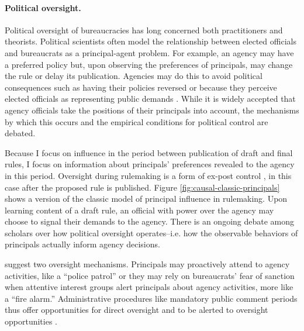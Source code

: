 \paragraph{Political oversight.}
Political oversight of bureaucracies has long concerned both practitioners and theorists.  %
Political scientists often model the relationship between elected officials and bureaucrats as a principal-agent problem. For example, an agency may have a preferred policy but, upon observing the preferences of principals, may change the rule or delay its publication. Agencies may do this to avoid political consequences such as having their policies reversed \citep{Potter2016} or because they perceive elected officials as representing public demands \cite{Cuellar2005}. While it is widely accepted that agency officials take the positions of their principals into account, the mechanisms by which this occurs and the empirical conditions for political control are debated.


Because I focus on influence in the period between publication of draft and final rules, I focus on information about principals' preferences revealed to the agency in this period. Oversight during rulemaking is a form of ex-post control \citep{Epstein1994}, in this case after the proposed rule is published. Figure \ref{fig:causal-classic-principals} shows a version of the classic model of principal influence in rulemaking. Upon learning content of a draft rule, an official with power over the agency may choose to signal their demands to the agency. There is an ongoing debate among scholars over how political oversight operates--i.e. how the observable behaviors of principals actually inform agency decisions. 



\citet{McCubbins1987} suggest two oversight mechanisms. Principals may proactively attend to agency activities, like a ``police patrol'' or they may rely on bureaucrats' fear of sanction when attentive interest groups alert principals about agency activities, more like a ``fire alarm.'' Administrative procedures like mandatory public comment periods thus offer opportunities for direct oversight and to be alerted to oversight opportunities \citep{Balla1998}.



